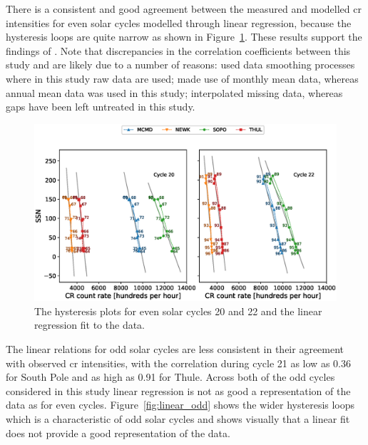 There is a consistent and good agreement between the measured and modelled \gls{cr} intensities for even solar cycles modelled through linear regression, because the hysteresis loops are quite narrow as shown in Figure~\ref{fig:linear_even}. These results support the findings of \cite{inceoglu_modeling_2014}. Note that discrepancies in the correlation coefficients between this study and \cite{inceoglu_modeling_2014} are likely due to a number of reasons: \cite{inceoglu_modeling_2014} used data smoothing processes where in this study raw data are used; \cite{inceoglu_modeling_2014} made use of monthly mean data, whereas annual mean data was used in this study; \cite{inceoglu_modeling_2014} interpolated missing data, whereas gaps have been left untreated in this study.

\begin{figure}
	\includegraphics[width=\columnwidth]{linear_even.eps}
	\caption{The hysteresis plots for even solar cycles 20 and 22 and the linear regression fit to the data.}
	\label{fig:linear_even}
\end{figure}

The linear relations for odd solar cycles are less consistent in their agreement with observed \gls{cr} intensities, with the correlation during cycle 21 as low as 0.36 for South Pole and as high as 0.91 for Thule. Across both of the odd cycles considered in this study linear regression is not as good a representation  of the data as for even cycles. Figure~\ref{fig:linear_odd} shows the wider hysteresis loops which is a characteristic of odd solar cycles and shows visually that a linear fit does not provide a good representation of the data. 


